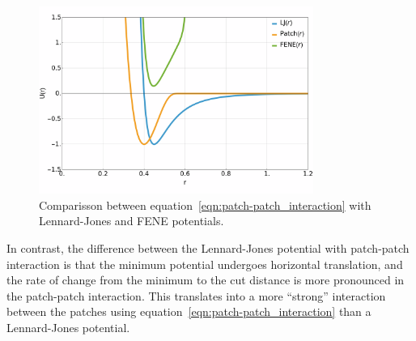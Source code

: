 \begin{figure}[ht!]
    \centering
    \includegraphics[width=0.8\textwidth]{figs/numerical/patchpatch.png}
    \caption{Comparisson between equation~\eqref{eqn:patch-patch_interaction} with Lennard-Jones and FENE potentials.}\label{fig:patchpatchpot}
\end{figure}

In contrast, the difference between the Lennard-Jones potential with patch-patch interaction is that the minimum potential undergoes horizontal translation, and the rate of change from the minimum to the cut distance is more pronounced in the patch-patch interaction.
This translates into a more ``strong'' interaction between the patches using equation~\eqref{eqn:patch-patch_interaction} than a Lennard-Jones potential.


